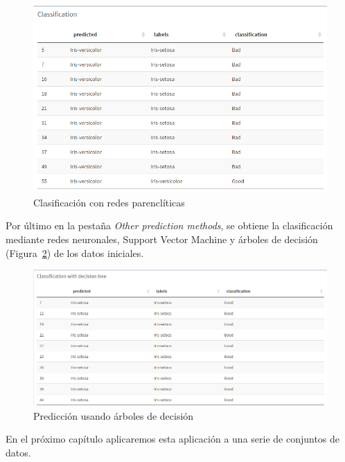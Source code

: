 \begin{figure}[tbph!]
	\centering
	\includegraphics[width=0.7\linewidth]{imagenes/clasificacion}
	\caption{Clasificación con redes parenclíticas}
	\label{fig:clasificacion}
\end{figure}

Por último en la pestaña \textit{Other prediction methods}, se obtiene la clasificación mediante redes neuronales, Support Vector Machine y árboles de decisión (Figura~\ref{fig:prediccionML}) de los datos iniciales.\\

\begin{figure}[tbph!]
	\centering
	\includegraphics[width=0.7\linewidth]{imagenes/prediccionML}
	\caption{Predicción usando árboles de decisión}
	\label{fig:prediccionML}
\end{figure}

En el próximo capítulo aplicaremos esta aplicación a una serie de conjuntos de datos.